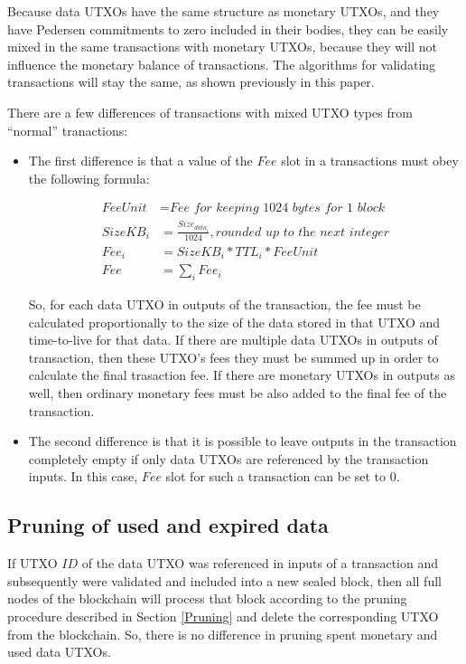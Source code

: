 \documentclass[a4paper, 10pt, conference]{ieeeconf}
\begin{document}
Because data UTXOs have the same structure as monetary UTXOs, and they have Pedersen commitments to zero included in their bodies, they can be easily mixed in the same transactions with monetary UTXOs, because they will not influence the monetary balance of transactions. The algorithms for validating transactions will stay the same, as shown previously in this paper.

There are a few differences of transactions with mixed UTXO types from ``normal'' tranactions:

\begin{itemize}

	\item{The first difference is that a value of the $Fee$ slot in a transactions must obey the following formula:

	\begin{align*}
		FeeUnit &= \textit{Fee for keeping 1024 bytes for 1 block} \\
		SizeKB_i &= \frac{Size_{data_i}}{1024}, \textit{rounded up to the next integer}\\
		Fee_i &= SizeKB_i * TTL_i * FeeUnit\\
		Fee &= \sum_i Fee_i
	\end{align*}

	So, for each data UTXO in outputs of the transaction, the fee must be calculated proportionally to the size of the data stored in that UTXO and time-to-live for that data. If there are multiple data UTXOs in outputs of transaction, then these UTXO's fees they must be summed up in order to calculate the final trasaction fee. If there are monetary UTXOs in outputs as well, then ordinary monetary fees must be also added to the final fee of the transaction.}

	\item{The second difference is that it is possible to leave outputs in the transaction completely empty if only data UTXOs are referenced by the transaction inputs. In this case, $Fee$ slot for such a transaction can be set to $0$.}
\end{itemize}

\subsection{Pruning of used and expired data}

If UTXO $ID$ of the data UTXO was referenced in inputs of a transaction and subsequently were validated and included into a new sealed block, then all full nodes of the blockchain will process that block according to the pruning procedure described in Section \ref{Pruning} and delete the corresponding UTXO from the blockchain. So, there is no difference in pruning spent monetary and used data UTXOs.
\end{document}
